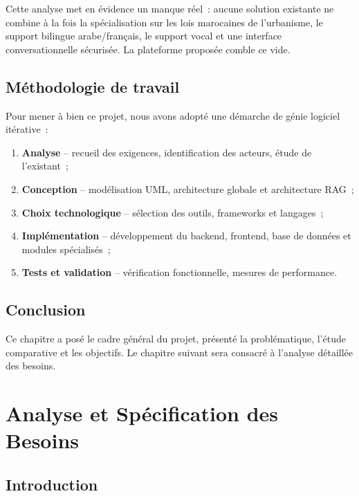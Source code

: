 \documentclass[12pt,a4paper]{report}
\begin{document}
Cette analyse met en évidence un manque réel~: aucune solution existante ne combine à la fois la spécialisation sur les lois marocaines de l'urbanisme, le support bilingue arabe/français, le support vocal et une interface conversationnelle sécurisée. La plateforme proposée comble ce vide.

\section{Méthodologie de travail}

Pour mener à bien ce projet, nous avons adopté une démarche de génie logiciel itérative~:

\begin{enumerate}[label=\textbf{Phase \arabic*~:}]
    \item \textbf{Analyse} -- recueil des exigences, identification des acteurs, étude de l'existant~;
    \item \textbf{Conception} -- modélisation UML, architecture globale et architecture RAG~;
    \item \textbf{Choix technologique} -- sélection des outils, frameworks et langages~;
    \item \textbf{Implémentation} -- développement du backend, frontend, base de données et modules spécialisés~;
    \item \textbf{Tests et validation} -- vérification fonctionnelle, mesures de performance.
\end{enumerate}

\section{Conclusion}

Ce chapitre a posé le cadre général du projet, présenté la problématique, l'étude comparative et les objectifs. Le chapitre suivant sera consacré à l'analyse détaillée des besoins.

\chapter{Analyse et Spécification des Besoins}
\label{chap:analyse}

\section{Introduction}
\end{document}
